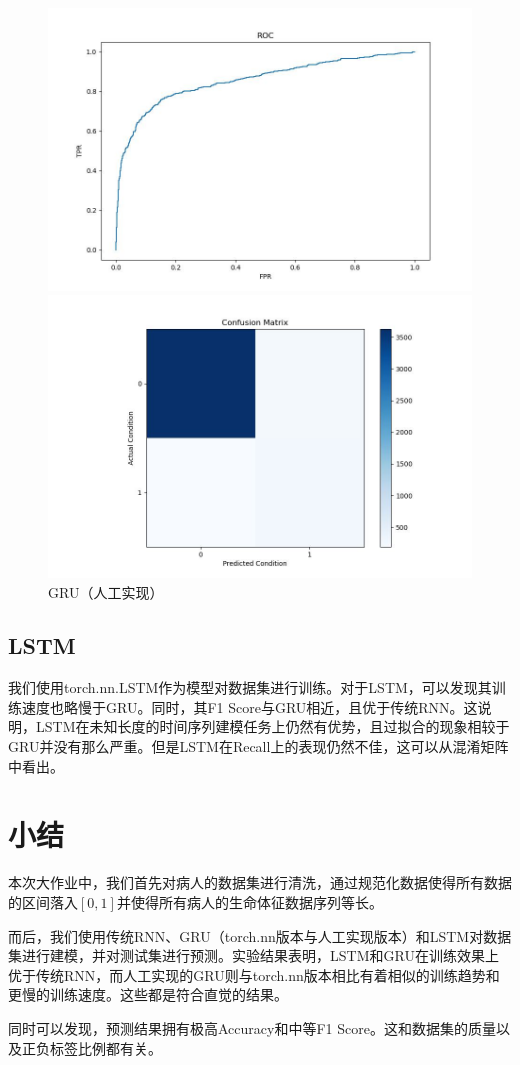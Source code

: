 \documentclass[UTF8]{article}
\begin{document}
\begin{figure}[h]
    \begin{minipage}{.48\linewidth}
        \centering
        \includegraphics[width=\linewidth]{../figure/GRUManual_ROC.jpg}
    \end{minipage}
    \begin{minipage}{.48    \linewidth}
        \centering
        \includegraphics[width=\linewidth]{../figure/GRUManual_Confusion.jpg}
    \end{minipage}
    \caption{GRU（人工实现）}
\end{figure}

\subsection{LSTM}
我们使用torch.nn.LSTM作为模型对数据集进行训练。对于LSTM，可以发现其训练速度也略慢于GRU。同时，其F1 Score与GRU相近，且优于传统RNN。这说明，LSTM在未知长度的时间序列建模任务上仍然有优势，且过拟合的现象相较于GRU并没有那么严重。但是LSTM在Recall上的表现仍然不佳，这可以从混淆矩阵中看出。

\newpage
\section{小结}
本次大作业中，我们首先对病人的数据集进行清洗，通过规范化数据使得所有数据的区间落入$[0,1]$并使得所有病人的生命体征数据序列等长。

而后，我们使用传统RNN、GRU（torch.nn版本与人工实现版本）和LSTM对数据集进行建模，并对测试集进行预测。实验结果表明，LSTM和GRU在训练效果上优于传统RNN，而人工实现的GRU则与torch.nn版本相比有着相似的训练趋势和更慢的训练速度。这些都是符合直觉的结果。

同时可以发现，预测结果拥有极高Accuracy和中等F1 Score。这和数据集的质量以及正负标签比例都有关。
\end{document}
